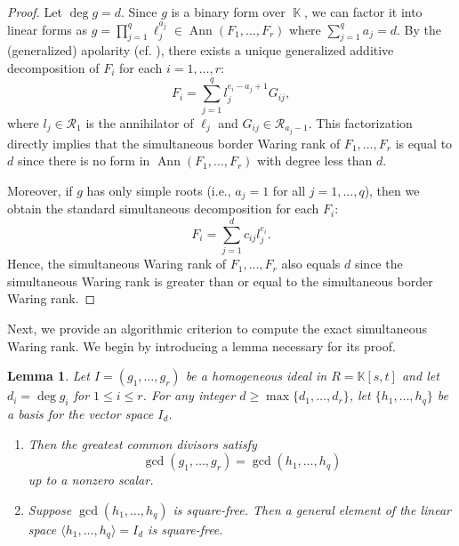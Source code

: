\documentclass[a4paper, 11pt]{amsart}
\numberwithin{theorem}{section}
\newtheorem{lemma}[theorem]{Lemma}
\theoremstyle{definition}
\numberwithin{equation}{section}
\DeclareMathOperator{\KK}{\mathbb{K}}
\DeclareMathOperator{\Ann}{\operatorname{Ann}}
\begin{document}
\begin{proof}
    Let $\deg g = d$. 
    Since $g$ is a binary form over $\KK$, we can factor it into linear forms as $g = \prod_{j = 1}^{q} \ell_j^{a_j} \in \Ann(F_1, \dots, F_r)$ where $\sum_{j=1}^q a_j = d$. 
    By the (generalized) apolarity (cf. \cite[Proposition 1.36]{MR1735271}), there exists a unique generalized additive decomposition of $F_i$ for each $i = 1, \dots, r$:
    \[
    F_i = \sum_{j = 1}^{q} l_j^{e_i-a_j+1} G_{ij},
    \]
    where $l_j\in \mathcal{R}_1$ is the annihilator of $\ell_j$ and $G_{ij} \in \mathcal{R}_{a_j - 1}$. 
    This factorization directly implies that the simultaneous border Waring rank of $F_1, \dots, F_r$ is equal to $d$ since there is no form in $\Ann(F_1,\ldots,F_r)$ with degree less than $d$.
    
    Moreover, if $g$ has only simple roots (i.e., $a_j = 1$ for all $j = 1, \dots, q$), then we obtain the standard simultaneous decomposition for each $F_i$:
    \[
    F_i = \sum_{j = 1}^{d} c_{ij} l_j^{e_i}.
    \]
    Hence, the simultaneous Waring rank of $F_1, \dots, F_r$ also equals $d$ since the simultaneous Waring rank is greater than or equal to the simultaneous border Waring rank.
\end{proof}

Next, we provide an algorithmic criterion to compute the exact simultaneous Waring rank. 
We begin by introducing a lemma necessary for its proof.
\begin{lemma}\label{lem:honestsimultaneousrank}
    Let $I = (g_1, \dots, g_r)$ be a homogeneous ideal in $R = \mathbb{K}[s,t]$ and let $d_i = \deg g_i$ for $1 \leq i \leq r$. 
    For any integer $d \geq \max\{d_1, \dots, d_r\}$, let $\{h_1, \dots, h_q\}$ be a basis for the vector space $I_d$.
    \begin{enumerate}
        \item\label{lem:same_gcd} Then the greatest common divisors satisfy
        \[
        \gcd(g_1, \dots, g_r) = \gcd(h_1, \dots, h_q)
        \]
        up to a nonzero scalar.
        \item\label{lem:bertini} Suppose $\gcd(h_1, \dots, h_q)$ is square-free. 
        Then a general element of the linear space $\langle h_1, \dots, h_q \rangle = I_d$ is square-free.
    \end{enumerate}
\end{lemma}
\end{document}
